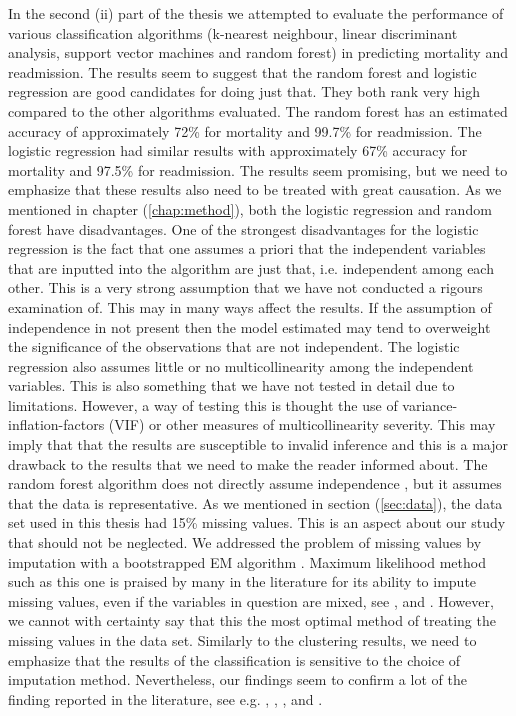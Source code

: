 \documentclass[../thesis.tex]{subfiles}
\begin{document}
\indent In the second (ii) part of the thesis we attempted to evaluate the performance of various classification algorithms (k-nearest neighbour, linear discriminant analysis, support vector machines and random forest) in predicting mortality and readmission. The results seem to suggest that the random forest and logistic regression are good candidates for doing just that. They both rank very high compared to the other algorithms evaluated. The random forest has an estimated accuracy of approximately 72\% for mortality and 99.7\% for readmission. The logistic regression had similar results with approximately 67\% accuracy for mortality and 97.5\% for readmission. The results seem promising, but we need to emphasize that these results also need to be treated with great causation. As we mentioned in chapter (\ref{chap:method}), both the logistic regression and random forest have disadvantages. One of the strongest disadvantages for the logistic regression is the fact that one assumes a priori that the independent variables that are inputted into the algorithm are just that, i.e. independent among each other. This is a very strong assumption that we have not conducted a rigours examination of. This may in many ways affect the results. If the assumption of independence in not present then the model estimated may tend to overweight the significance of the observations that are not independent. The logistic regression also assumes little or no multicollinearity among the independent variables. This is also something that we have not tested in detail due to limitations. However, a way of testing this is thought the use of variance-inflation-factors (VIF) or other measures of multicollinearity severity. This may imply that that the results are susceptible to invalid inference and this is a major drawback to the results that we need to make the reader informed about. The random forest algorithm does not directly assume independence \citep{friedman2009elements}, but it assumes that the data is representative. As we mentioned in section (\ref{sec:data}), the data set used in this thesis had 15\% missing values. This is an aspect about our study that should not be neglected. We addressed the problem of missing values by imputation with a bootstrapped EM algorithm \citep{honaker2011amelia}. Maximum likelihood method such as this one is praised by many in the literature for its ability to impute missing values, even if the variables in question are mixed, see \cite{schafer1997analysis}, \cite{schafer1998multiple} and \cite{allison1999missing}. However, we cannot with certainty say that this the most optimal method of treating the missing values in the data set. Similarly to the clustering results, we need to emphasize that the results of the classification is sensitive to the choice of imputation method. Nevertheless, our findings seem to confirm a lot of the finding reported in the literature, see e.g. \cite{austin2012regression}, \cite{zolfaghar2013big}, \cite{shah2014phenomapping}, \cite{panahiazar2015using} and \cite{koulaouzidis2016telemonitoring}.\\
\end{document}
